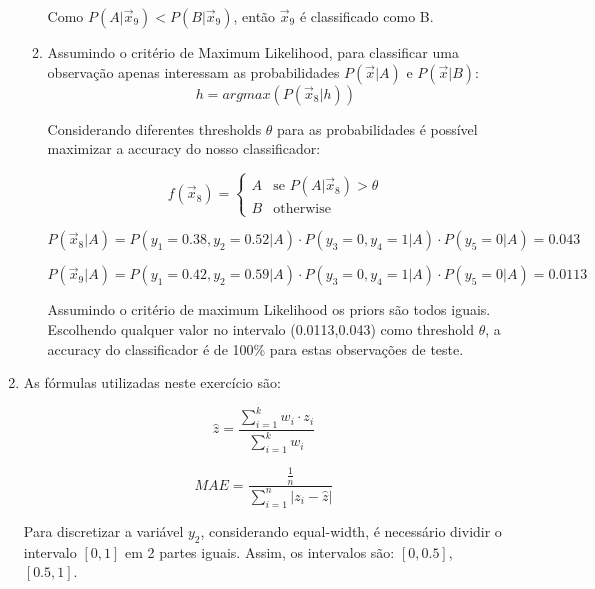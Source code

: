 \documentclass[a4paper,12pt]{article} %
\begin{document}
\begin{enumerate}
\begin{enumerate}
Como $P(A|\vec{x}_9) < P(B|\vec{x}_9)$, então $\vec{x}_9$ é classificado como B. 

\item 
Assumindo o critério de Maximum Likelihood, para classificar uma observação apenas interessam as probabilidades $P(\vec{x}|A)$ e $P(\vec{x}|B)$:
\begin{equation*}
    h = argmax(P(\vec{x}_8|h))
\end{equation*}

Considerando diferentes thresholds $\theta$ para as probabilidades é possível maximizar a accuracy do nosso classificador:

\begin{equation*}
    f(\vec{x}_8) = \begin{cases} 
        A & \text{se } P(A|\vec{x}_8) > \theta \\
        B &  \text{otherwise}
     \end{cases}
\end{equation*}


\begin{equation*}
    P(\vec{x}_8|A) = P(y_1=0.38,y_2=0.52|A) \cdot P(y_3=0,y_4=1|A) \cdot P(y_5=0|A) = 0.043
\end{equation*}

\begin{equation*}
    P(\vec{x}_9|A) = P(y_1=0.42,y_2=0.59|A) \cdot P(y_3=0,y_4=1|A) \cdot P(y_5=0|A) = 0.0113
\end{equation*}

Assumindo o critério de maximum Likelihood os priors são todos iguais.
Escolhendo qualquer valor no intervalo (0.0113,0.043) como threshold $\theta$, a accuracy do classificador é de 100\% para estas observações de teste.

\end{enumerate}

\item

As  fórmulas utilizadas neste exercício são:

\begin{equation*}
    \hat{z} = \frac{\sum_{i=1}^{k} w_i \cdot z_{i}}{\sum_{i=1}^{k} w_i}
\end{equation*}

\begin{equation*}
    MAE = \frac{\frac{1}{n}}{\sum_{i=1}^{n} |z_i - \hat{z}|}
\end{equation*}

Para discretizar a variável $y_2$, considerando equal-width, é necessário dividir o intervalo $[0,1]$ em 2 partes iguais. 
Assim, os intervalos são: $[0,0.5]$, $[0.5,1]$. \\


\end{enumerate}
\end{document}
